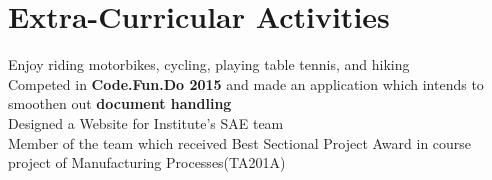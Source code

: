 \documentclass[a4paper]{norm-resume}
\begin{document}

\section{Extra-Curricular Activities \hrulefill}
Enjoy riding motorbikes, cycling, playing table tennis, and hiking \\
Competed in \textbf{Code.Fun.Do 2015} and made an application which intends to smoothen out \textbf{document handling} \\
Designed a Website for Institute’s SAE team \\
Member of the team which received Best Sectional Project Award in course project of Manufacturing Processes(TA201A) \\
\end{document}
